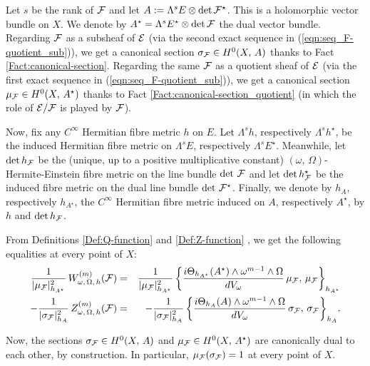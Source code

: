 \documentclass[12pt]{article}
\begin{document}
Let $s$ be the rank of ${\cal F}$ and let $A:=\Lambda^sE\otimes\det{\cal F}^\star$. This is a holomorphic vector bundle on $X$. We denote by $A^\star = \Lambda^sE^\star\otimes\det{\cal F}$ the dual vector bundle. Regarding ${\cal F}$ as a subsheaf of ${\cal E}$ (via the second exact sequence in (\ref{eqn:seq_F-quotient_sub})), we get a canonical section $\sigma_{{\cal F}}\in H^0(X,\,A)$ thanks to Fact \ref{Fact:canonical-section}. Regarding the same ${\cal F}$ as a quotient sheaf of ${\cal E}$ (via the first exact sequence in (\ref{eqn:seq_F-quotient_sub})), we get a canonical section $\mu_{{\cal F}}\in H^0(X,\,A^\star)$ thanks to Fact \ref{Fact:canonical-section_quotient} (in which the role of ${\cal E}/{\cal F}$ is played by ${\cal F}$).

Now, fix any $C^\infty$ Hermitian fibre metric $h$ on $E$. Let $\Lambda^sh$, respectively $\Lambda^sh^\star$, be the induced Hermitian fibre metric on $\Lambda^sE$, respectively $\Lambda^sE^\star$. Meanwhile, let $\det h_{\cal F}$ be the (unique, up to a positive multiplicative constant) $(\omega,\,\Omega)$-Hermite-Einstein fibre metric on the line bundle $\det\,{\cal F}$ and let $\det h_{\cal F}^\star$ be the induced fibre metric on the dual line bundle $\det\,{\cal F}^\star$. Finally, we denote by $h_A$, respectively $h_{A^\star}$, the $C^\infty$ Hermitian fibre metric induced on $A$, respectively $A^\star$, by $h$ and $\det h_{\cal F}$. 

From Definitions \ref{Def:Q-function} and \ref{Def:Z-function} , we get the following equalities at every point of $X$: \begin{eqnarray}\label{eqn:Q-Z_A-A-star}\nonumber\frac{1}{|\mu_{\cal F}|_{h_{A^\star}}^2}\,W_{\omega,\,\Omega,\,h}^{(m)}({\cal F}) & = & \frac{1}{|\mu_{\cal F}|_{h_{A^\star}}^2}\,\bigg\{\frac{i\Theta_{h_{A^\star}}(A^\star)\wedge\omega^{m-1}\wedge\Omega}{dV_\omega}\,\mu_{{\cal F}},\,\mu_{{\cal F}}\bigg\}_{h_{A^\star}}  \\
 -\frac{1}{|\sigma_{\cal F}|_{h_A}^2}\,Z_{\omega,\,\Omega,\,h}^{(m)}({\cal F}) & = & -\frac{1}{|\sigma_{\cal F}|_{h_A}^2}\,\bigg\{\frac{i\Theta_{h_A}(A)\wedge\omega^{m-1}\wedge\Omega}{dV_\omega}\,\sigma_{{\cal F}},\,\sigma_{{\cal F}}\bigg\}_{h_A}.\end{eqnarray}

\vspace{2ex}

Now, the sections $\sigma_{{\cal F}}\in H^0(X,\,A)$ and $\mu_{{\cal F}}\in H^0(X,\,A^\star)$ are canonically dual to each other, by construction. In particular, $\mu_{{\cal F}}(\sigma_{{\cal F}}) = 1$ at every point of $X$.
\end{document}
